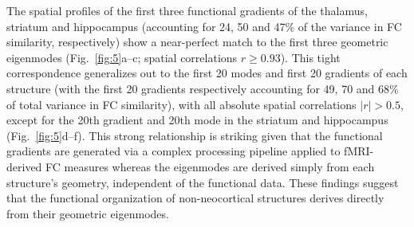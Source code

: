 \documentclass[sn-mathphys-num]{sn-jnl}%
\theoremstyle{thmstyleone}%
\theoremstyle{thmstyletwo}%
\theoremstyle{thmstylethree}%
\begin{document}
The spatial profiles of the first three functional gradients of the thalamus, striatum and hippocampus (accounting for 24, 50 and 47\% of the variance in FC similarity, respectively) show a near-perfect match to the first three geometric eigenmodes (Fig.~\ref{fig:5}a–c; spatial correlations $ r\geq0.93 $). 
This tight correspondence generalizes out to the first 20 modes and first 20 gradients of each structure (with the first 20 gradients respectively accounting for 49, 70 and 68\% of total variance in FC similarity), with all absolute spatial correlations $ |r| > 0.5 $, except for the 20th gradient and 20th mode in the striatum and hippocampus (Fig.~\ref{fig:5}d–f). 
This strong relationship is striking given that the functional gradients are generated via a complex processing pipeline applied to fMRI-derived FC measures whereas the eigenmodes are derived simply from each structure’s geometry, independent of the functional data. These findings suggest that the functional organization of non-neocortical structures derives directly from their geometric eigenmodes.


\end{document}
